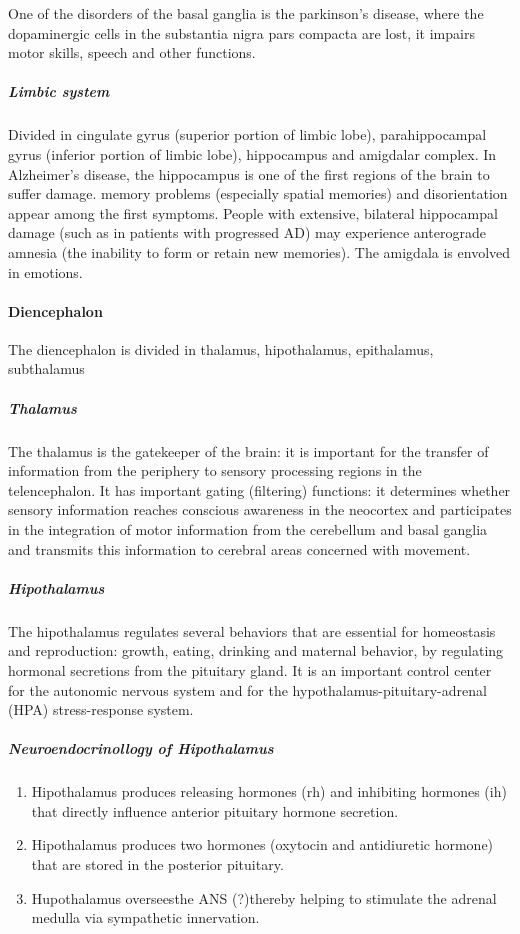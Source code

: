 \documentclass[12pt,article,oneside,a4paper]{memoir}
\begin{document}
One of the disorders of the basal ganglia is the parkinson's disease, where the dopaminergic cells in the substantia nigra pars compacta are lost, it impairs motor skills, speech and other functions.

\subparagraph{Limbic system}
Divided in cingulate gyrus (superior portion of limbic lobe), parahippocampal gyrus (inferior portion of limbic lobe), hippocampus and amigdalar complex.
In Alzheimer's disease, the hippocampus is one of the first regions of the brain to suffer damage. memory problems (especially spatial memories) and disorientation appear among the first symptoms. People with extensive, bilateral hippocampal damage (such as in patients with progressed AD) may experience anterograde amnesia (the inability to form or retain new memories).
The amigdala is envolved in emotions.

\paragraph{Diencephalon}
The diencephalon is divided in thalamus, hipothalamus, epithalamus, subthalamus

\subparagraph{Thalamus}
The thalamus is the gatekeeper of the brain: it is important for the transfer of information from the periphery to sensory processing regions in the telencephalon. It has important gating (filtering) functions: it determines whether sensory information reaches conscious awareness in the neocortex and participates in the integration of motor information from the cerebellum and basal ganglia and transmits this information to cerebral areas concerned with movement.

\subparagraph{Hipothalamus}
The hipothalamus regulates several behaviors that are essential for homeostasis
and reproduction: growth, eating, drinking and maternal behavior, by regulating hormonal secretions from the pituitary gland. It is an important control center for the autonomic nervous system and for the hypothalamus-pituitary-adrenal (HPA) stress-response system.

\subparagraph{Neuroendocrinollogy of Hipothalamus}
\begin{enumerate}
\item Hipothalamus produces releasing hormones (rh) and inhibiting hormones (ih) that directly influence anterior pituitary hormone secretion.
\item Hipothalamus produces two hormones (oxytocin and antidiuretic hormone) that are stored in the posterior pituitary.
\item Hupothalamus overseesthe ANS (?)thereby helping to stimulate the adrenal medulla via sympathetic innervation.
\end{enumerate}
\end{document}
